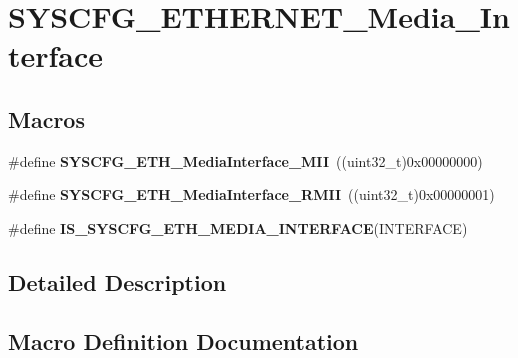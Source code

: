 \hypertarget{group___s_y_s_c_f_g___e_t_h_e_r_n_e_t___media___interface}{}\section{S\+Y\+S\+C\+F\+G\+\_\+\+E\+T\+H\+E\+R\+N\+E\+T\+\_\+\+Media\+\_\+\+Interface}
\label{group___s_y_s_c_f_g___e_t_h_e_r_n_e_t___media___interface}
\subsection*{Macros}
\begin{DoxyCompactItemize}
\item 
\hypertarget{group___s_y_s_c_f_g___e_t_h_e_r_n_e_t___media___interface_ga07d3a311515069bb26e8f84febc80494}{}\#define {\bfseries S\+Y\+S\+C\+F\+G\+\_\+\+E\+T\+H\+\_\+\+Media\+Interface\+\_\+\+M\+I\+I}~((uint32\+\_\+t)0x00000000)\label{group___s_y_s_c_f_g___e_t_h_e_r_n_e_t___media___interface_ga07d3a311515069bb26e8f84febc80494}

\item 
\hypertarget{group___s_y_s_c_f_g___e_t_h_e_r_n_e_t___media___interface_ga0608a8f6380bcf7de7c87dd331740857}{}\#define {\bfseries S\+Y\+S\+C\+F\+G\+\_\+\+E\+T\+H\+\_\+\+Media\+Interface\+\_\+\+R\+M\+I\+I}~((uint32\+\_\+t)0x00000001)\label{group___s_y_s_c_f_g___e_t_h_e_r_n_e_t___media___interface_ga0608a8f6380bcf7de7c87dd331740857}

\item 
\#define {\bfseries I\+S\+\_\+\+S\+Y\+S\+C\+F\+G\+\_\+\+E\+T\+H\+\_\+\+M\+E\+D\+I\+A\+\_\+\+I\+N\+T\+E\+R\+F\+A\+C\+E}(I\+N\+T\+E\+R\+F\+A\+C\+E)
\end{DoxyCompactItemize}


\subsection{Detailed Description}


\subsection{Macro Definition Documentation}
\hypertarget{group___s_y_s_c_f_g___e_t_h_e_r_n_e_t___media___interface_gaaf950ee46f31e95060335eba33910d01}{}
